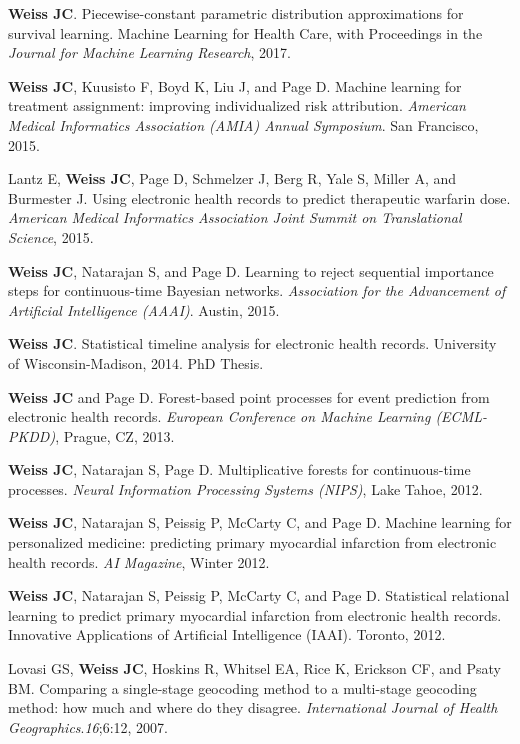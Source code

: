 \begin{bibsection}

\item  \textbf{Weiss JC}. Piecewise-constant parametric distribution approximations for survival learning. Machine Learning for Health Care, with Proceedings in the \emph{Journal for Machine Learning Research}, 2017.

\item  \textbf{Weiss JC}, Kuusisto F, Boyd K, Liu J, and Page D. Machine learning for treatment assignment: improving individualized risk attribution. \textit{American Medical Informatics Association (AMIA) Annual Symposium}. San Francisco, 2015.

\item  Lantz E, \textbf{Weiss JC}, Page D, Schmelzer J, Berg R, Yale S, Miller A, and Burmester J. Using electronic health records to predict therapeutic warfarin dose. \textit{American Medical Informatics Association Joint Summit on Translational Science}, 2015.

\item  \textbf{Weiss JC}, Natarajan S, and Page D. Learning to reject sequential importance steps for continuous-time Bayesian networks. \textit{Association for the Advancement of Artificial Intelligence (AAAI)}. Austin, 2015.

\item  \textbf{Weiss JC}. Statistical timeline analysis for electronic health records. University of Wisconsin-Madison, 2014. PhD Thesis.

\item  \textbf{Weiss JC} and Page D. Forest-based point processes for event prediction from electronic health records. \textit{European Conference on Machine Learning (ECML-PKDD)}, Prague, CZ, 2013.

\item  \textbf{Weiss JC}, Natarajan S, Page D. Multiplicative forests for continuous-time processes. \textit{Neural Information Processing Systems (NIPS)}, Lake Tahoe, 2012.

\item  \textbf{Weiss JC}, Natarajan S, Peissig P, McCarty C, and Page D. Machine learning for personalized medicine: predicting primary myocardial infarction from electronic health records. \textit{AI Magazine}, Winter 2012.

\item  \textbf{Weiss JC}, Natarajan S, Peissig P, McCarty C, and Page D. Statistical relational learning to predict primary myocardial infarction from electronic health records. Innovative Applications of Artificial Intelligence (IAAI). Toronto, 2012.

\item  Lovasi GS, \textbf{Weiss JC}, Hoskins R, Whitsel EA, Rice K, Erickson CF, and Psaty BM. Comparing a single-stage geocoding method to a multi-stage geocoding method: how much and where do they disagree. \textit{International Journal of Health Geographics}.\textit{16};6:12, 2007.
  
\end{bibsection}

